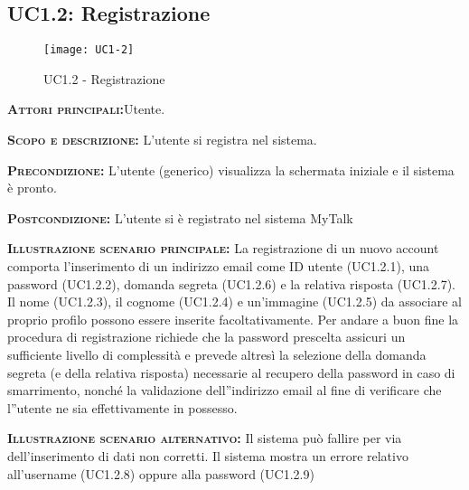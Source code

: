 \subsection{UC1.2: Registrazione}
\begin{figure}[H]
\begin{center}
\texttt{[image: UC1-2]}
\caption{UC1.2 - Registrazione}\label{fig:registrazione}
\end{center}
\end{figure}
\begin{description}
\item{\scshape\bfseries Attori principali:}Utente.
\item{\scshape\bfseries Scopo e descrizione:} L'utente si registra nel sistema.
\item{\scshape\bfseries Precondizione:} L'utente (generico) visualizza la schermata iniziale e il sistema è pronto.
\item{\scshape\bfseries Postcondizione:} L'utente si è registrato nel sistema MyTalk
\item{\scshape\bfseries Illustrazione scenario principale:} La registrazione di un nuovo account comporta l'inserimento di un indirizzo email come ID utente (UC1.2.1), una password (UC1.2.2), domanda segreta (UC1.2.6) e la relativa risposta (UC1.2.7). Il nome (UC1.2.3), il cognome (UC1.2.4) e un'immagine (UC1.2.5) da associare al proprio profilo possono essere inserite facoltativamente. Per andare a buon fine la procedura di registrazione richiede che la password prescelta assicuri un sufficiente livello di complessità e prevede altresì la selezione della domanda segreta (e della relativa risposta) necessarie al recupero della password in caso di smarrimento, nonché la validazione dell''indirizzo email al fine di verificare che l''utente ne sia effettivamente in possesso.
\item{\scshape\bfseries Illustrazione scenario alternativo:} Il sistema può fallire per via dell'inserimento di dati non corretti. Il sistema mostra un errore relativo all'username (UC1.2.8) oppure alla password (UC1.2.9)
\end{description}

